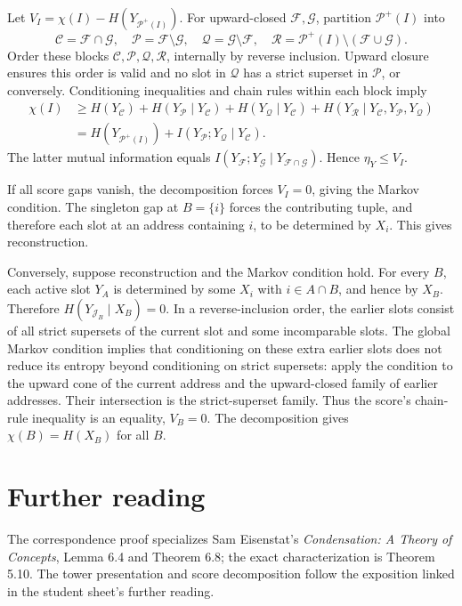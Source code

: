 \documentclass[11pt]{article}
\newcommand{\PI}{\mathcal{P}^{+}(I)}
\begin{document}
Let $V_I=\chi(I)-H(Y_{\PI})$. For upward-closed $\mathcal{F},\mathcal{G}$,
partition $\PI$ into
\[
 \mathcal{C}=\mathcal{F}\cap\mathcal{G},\quad
 \mathcal{P}=\mathcal{F}\setminus\mathcal{G},\quad
 \mathcal{Q}=\mathcal{G}\setminus\mathcal{F},\quad
 \mathcal{R}=\PI\setminus(\mathcal{F}\cup\mathcal{G}).
\]
Order these blocks $\mathcal{C},\mathcal{P},\mathcal{Q},\mathcal{R}$, internally
by reverse inclusion. Upward closure ensures this order is valid and no slot
in $\mathcal{Q}$ has a strict superset in $\mathcal{P}$, or conversely.
Conditioning inequalities and chain rules within each block imply
\begin{align*}
 \chi(I)&\ge H(Y_{\mathcal{C}})+H(Y_{\mathcal{P}}\mid Y_{\mathcal{C}})
 +H(Y_{\mathcal{Q}}\mid Y_{\mathcal{C}})
 +H(Y_{\mathcal{R}}\mid Y_{\mathcal{C}},Y_{\mathcal{P}},Y_{\mathcal{Q}})\\
 &=H(Y_{\PI})+I(Y_{\mathcal{P}};Y_{\mathcal{Q}}\mid Y_{\mathcal{C}}).
\end{align*}
The latter mutual information equals
$I(Y_{\mathcal{F}};Y_{\mathcal{G}}\mid Y_{\mathcal{F}\cap\mathcal{G}})$.
Hence $\eta_Y\le V_I$.

If all score gaps vanish, the decomposition forces $V_I=0$, giving the Markov
condition. The singleton gap at $B=\{i\}$ forces the contributing tuple,
and therefore each slot at an address containing $i$, to be determined by
$X_i$. This gives reconstruction.

Conversely, suppose reconstruction and the Markov condition hold.
For every $B$, each active slot $Y_A$ is determined by some $X_i$ with
$i\in A\cap B$, and hence by $X_B$. Therefore
$H(Y_{\mathcal{J}_B}\mid X_B)=0$.
In a reverse-inclusion order, the earlier slots consist of all strict
supersets of the current slot and some incomparable slots. The global
Markov condition implies that conditioning on these extra earlier slots does
not reduce its entropy beyond conditioning on strict supersets: apply the
condition to the upward cone of the current address and the upward-closed
family of earlier addresses. Their intersection is the strict-superset
family. Thus the score's chain-rule inequality is an equality, $V_B=0$.
The decomposition gives $\chi(B)=H(X_B)$ for all $B$.

\section{Further reading}
The correspondence proof specializes Sam Eisenstat's \emph{Condensation: A
Theory of Concepts}, Lemma 6.4 and Theorem 6.8; the exact characterization is
Theorem 5.10. The tower presentation and score decomposition follow the exposition linked in
the student sheet's further reading.
\end{document}
